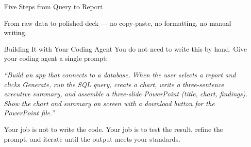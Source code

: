\documentclass[aspectratio=169]{beamer}
\begin{document}
\begin{frame}{Five Steps from Query to Report}
\begin{center}
\end{center}
\vspace{0.5cm}
From raw data to polished deck --- \alert{no copy-paste, no formatting, no manual writing.}
\end{frame}

\begin{frame}{Building It with Your Coding Agent}
You do not need to write this by hand.  Give your coding agent a single prompt:
\vspace{0.3cm}
\begin{shadedbox}
\small\textit{``Build an app that connects to a database.  When the user selects a report and clicks Generate, run the SQL query, create a chart, write a three-sentence executive summary, and assemble a three-slide PowerPoint (title, chart, findings).  Show the chart and summary on screen with a download button for the PowerPoint file.''}
\end{shadedbox}
\vspace{0.3cm}
Your job is not to write the code.  Your job is to \alert{test the result, refine the prompt, and iterate} until the output meets your standards.
\end{frame}
\end{document}
